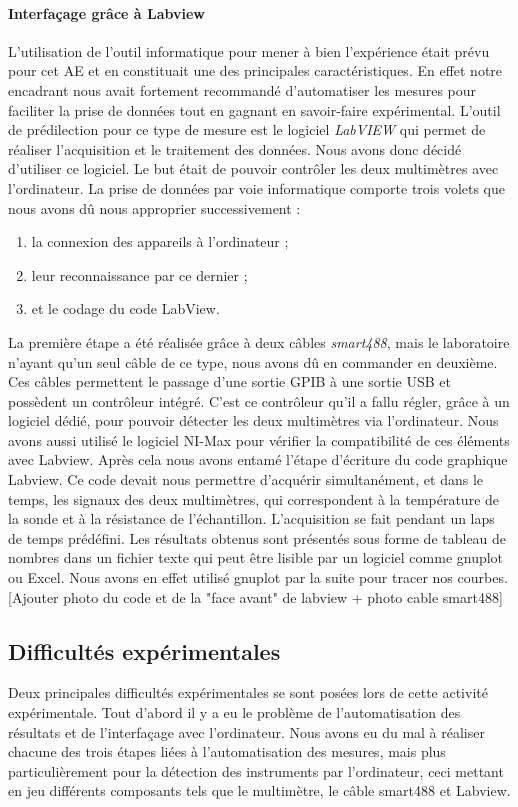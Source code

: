 \paragraph{Interfaçage grâce à Labview}
L'utilisation de l'outil informatique pour mener à bien l'expérience était prévu pour cet AE 
et en constituait une des principales caractéristiques. En effet notre encadrant nous avait fortement recommandé 
d'automatiser les mesures pour faciliter la prise de données tout en gagnant en savoir-faire expérimental. L'outil de 
prédilection pour ce type de mesure est le logiciel \emph{LabVIEW} qui permet de réaliser l'acquisition et le traitement des données. 
Nous avons donc décidé d'utiliser ce logiciel. Le but était de pouvoir contrôler les deux multimètres avec l'ordinateur. 
La prise de données par voie informatique comporte trois volets que nous avons dû nous approprier successivement : 

\begin{enumerate}
\item la connexion des appareils à l'ordinateur ; 
\item leur reconnaissance par ce dernier ; 
\item et le codage du code LabView. 
\end{enumerate}

La première étape a été réalisée grâce à deux câbles \emph{smart488}, mais le laboratoire n'ayant qu'un seul câble de ce type, nous avons dû en commander en deuxième.
Ces câbles permettent le passage d'une sortie GPIB à une sortie USB et possèdent un contrôleur intégré. 
C'est ce contrôleur qu'il a fallu régler, grâce à un logiciel dédié, pour pouvoir détecter les deux multimètres 
via l'ordinateur. Nous avons aussi utilisé le logiciel NI-Max pour vérifier la compatibilité de ces éléments avec Labview. 
Après cela nous avons entamé l'étape d'écriture du code graphique Labview. Ce code devait nous permettre d'acquérir 
simultanément, et dans le temps, les signaux des deux multimètres, qui correspondent à la température de la sonde 
et à la résistance de l'échantillon. L'acquisition se fait pendant un laps de temps prédéfini. Les résultats obtenus sont présentés sous forme de tableau de nombres dans un fichier texte qui peut être lisible par un logiciel comme gnuplot ou Excel.
Nous avons en effet utilisé gnuplot par la suite pour tracer nos courbes.
[Ajouter photo du code et de la "face avant" de labview + photo cable smart488]


\subsection{Difficultés expérimentales}
Deux principales difficultés expérimentales se sont posées lors de cette activité expérimentale.
Tout d'abord il y a eu le problème de l'automatisation des résultats et de l'interfaçage avec l'ordinateur.
Nous avons eu du mal à réaliser chacune des trois étapes liées à l'automatisation des mesures, mais plus particulièrement 
pour la détection des instruments par l'ordinateur, ceci mettant en jeu différents composants tels que le 
multimètre, le câble smart488 et Labview.

